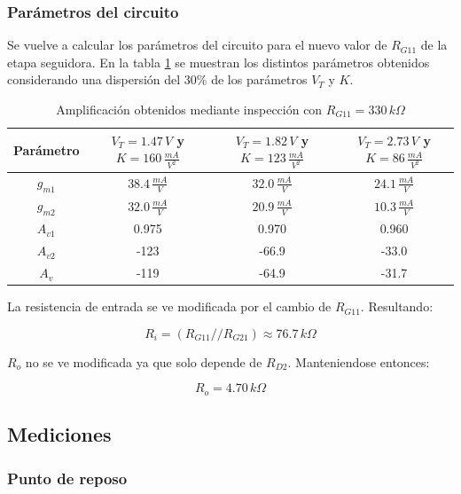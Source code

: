 \documentclass[10pt,spanish,a4paper,notitlepage]{article}
\begin{document}
\subsubsection{Parámetros del circuito}

Se vuelve a calcular los parámetros del circuito para el nuevo
valor de $R_{G11}$ de la etapa seguidora.
En la tabla \ref{table:B_modificado_Av_dispersion} se muestran
los distintos parámetros obtenidos considerando una dispersión
del 30\% de los parámetros $V_T$ y $K$.

\begin{table}[H]
\centering
\begin{tabular}{|c|c|c|c|} 
\hline
Parámetro & $V_{T}=1.47\,\unit{V}$ y $K=160\,\unit{\frac{mA}{V^2}}$ & 
$V_{T}=1.82\,\unit{V}$ y $K=123\,\unit{\frac{mA}{V^2}}$ &
$V_{T}=2.73\,\unit{V}$ y $K=86\,\unit{\frac{mA}{V^2}}$  \\ \hline
$g_{m1}$ & $38.4\,\unit{\frac{mA}{V}}$ & $32.0\,\unit{\frac{mA}{V}}$ & $24.1\,\unit{\frac{mA}{V}}$\\ \hline
$g_{m2}$ & $32.0\,\unit{\frac{mA}{V}}$ & $20.9\,\unit{\frac{mA}{V}}$ & $10.3\,\unit{\frac{mA}{V}}$\\ \hline
$A_{v1}$ & 0.975 & 0.970 & 0.960 \\ \hline
$A_{v2}$ & -123 & -66.9 & -33.0 \\ \hline
$A_{v}$ & -119 & -64.9 & -31.7 \\ \hline
\end{tabular}
\caption{Amplificación obtenidos mediante inspección con $R_{G11} = 330\,\unit{k\Omega}$}
\label{table:B_modificado_Av_dispersion}
\end{table}

La resistencia de entrada se ve modificada por el cambio de $R_{G11}$.
Resultando:

\[ \displaystyle R_i = (R_{G11} // R_{G21}) \approx 76.7\,\unit{k\Omega} \]

$R_o$ no se ve modificada ya que solo depende de $R_{D2}$. Manteniendose
entonces:

\[ \displaystyle R_o = 4.70\,\unit{k\Omega} \]


\subsection{Mediciones}

\subsubsection{Punto de reposo}
\end{document}
